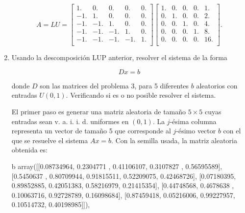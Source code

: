 \documentclass{article}
\begin{document}
\begin{enumerate}
    \begin{equation*}
        A = LU = \begin{bmatrix}
            1. & 0. & 0. & 0. & 0.\\
            -1. & 1. & 0. & 0. & 0.\\
            -1. & -1. & 1. & 0. & 0.\\
            -1. & -1. & -1. & 1. & 0.\\
            -1. & -1. & -1. & -1. & 1.\\
          \end{bmatrix} \begin{bmatrix}
            1. & 0. & 0. & 0. & 1.\\
            0. & 1. & 0. & 0. & 2.\\
            0. & 0. & 1. & 0. & 4.\\
            0. & 0. & 0. & 1. & 8.\\
            0. & 0. & 0. & 0. & 16.\\
          \end{bmatrix}.
    \end{equation*}


    \item Usando la descomposición LUP anterior, resolver el sistema de la forma

\begin{equation}
    Dx = b
\end{equation}

donde $D$ son las matrices del problema 3, para 5 diferentes $b$ aleatorios con entradas $U (0, 1)$. Verificando si es o no posible resolver el sistema.

    El primer paso es generar una matriz aleatoria de tamaño $5\times 5$ cuyas entradas sean v. a. i. i. d. uniformes
    en $(0,1)$. La $j$-ésima columna representa un vector de tamaño 5 que corresponde al $j$-ésimo
    vector $b$ con el que se resuelve el sistema $Ax = b$. Con la semilla usada, la matriz aleatoria
    obtenida es:

    \begin{verbatim*}
b
array([[0.08734964, 0.2304771 , 0.41106107, 0.3107827 , 0.56595589],
        [0.5450637 , 0.80709944, 0.91815511, 0.52209075, 0.42468726],
        [0.07180395, 0.89852885, 0.42051383, 0.58216979, 0.21415354],
        [0.44748568, 0.4678638 , 0.10063716, 0.92728789, 0.16098684],
        [0.87459418, 0.05216006, 0.99227957, 0.10514732, 0.40198985]]),\end{verbatim*}


\end{enumerate}
\end{document}

